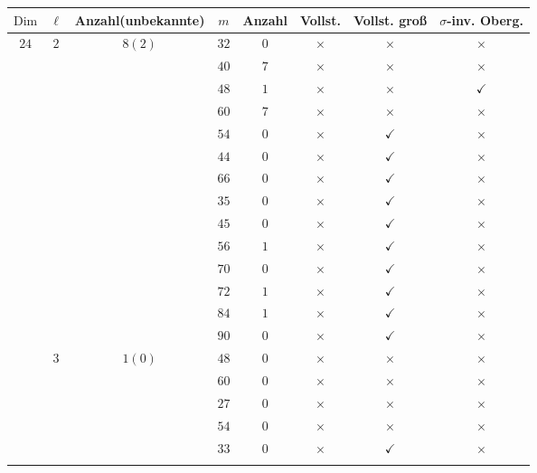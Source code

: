\documentclass[12pt,a4paper,halfparskip,headsepline,bibtotocnumbered]{scrreprt}
\theoremstyle{nummermitklammern}
\theoremstyle{nonumberbreak}
\newcommand{\Dim}{\text{Dim}}
\begin{document}
\begin{table}[H]
	\centering
	\begin{tabular}{|c|c|c|c|c|c|c|c|}
		\hline		
		$\Dim$					&$\ell$					&{Anzahl(unbekannte)}		&$m$	&Anzahl	&Vollst.	&Vollst. groß	&$\sigma$-inv. Oberg.\\ \hline
		\multirow{24}{*}{$24$}	&\multirow{14}{*}{$2$}	&\multirow{14}{*}{$8(2)$}	&$32$	&$0$	&$\times$		&$\times$		&$\times$\\ \cline{4-8}
								&						&							&$40$	&$7$	&$\times$		&$\times$		&$\times$\\ \cline{4-8}
								&						&							&$48$	&$1$	&$\times$		&$\times$		&$\checkmark$\\ \cline{4-8}
								&						&							&$60$	&$7$	&$\times$		&$\times$		&$\times$\\ \cline{4-8}
								&						&							&$54$	&$0$	&$\times$		&$\checkmark$	&$\times$\\ \cline{4-8}
								&						&							&$44$	&$0$	&$\times$		&$\checkmark$	&$\times$\\ \cline{4-8}
								&						&							&$66$	&$0$	&$\times$		&$\checkmark$	&$\times$\\ \cline{4-8}
								&						&							&$35$	&$0$	&$\times$		&$\checkmark$	&$\times$\\ \cline{4-8}
								&						&							&$45$	&$0$	&$\times$		&$\checkmark$	&$\times$\\ \cline{4-8}
								&						&							&$56$	&$1$	&$\times$		&$\checkmark$	&$\times$\\ \cline{4-8}
								&						&							&$70$	&$0$	&$\times$		&$\checkmark$	&$\times$\\ \cline{4-8}
								&						&							&$72$	&$1$	&$\times$		&$\checkmark$	&$\times$\\ \cline{4-8}
								&						&							&$84$	&$1$	&$\times$		&$\checkmark$	&$\times$\\ \cline{4-8}
								&						&							&$90$	&$0$	&$\times$		&$\checkmark$	&$\times$\\ \cline{2-8}
								&\multirow{10}{*}{$3$}	&\multirow{10}{*}{$1(0)$}	&$48$	&$0$	&$\times$		&$\times$		&$\times$\\ \cline{4-8}
								&						&							&$60$	&$0$	&$\times$		&$\times$		&$\times$\\ \cline{4-8}
								&						&							&$27$	&$0$	&$\times$		&$\times$		&$\times$\\ \cline{4-8}
								&						&							&$54$	&$0$	&$\times$		&$\times$		&$\times$\\ \cline{4-8}
								&						&							&$33$	&$0$	&$\times$		&$\checkmark$	&$\times$\\ \cline{4-8}

\end{tabular}
\end{table}
\end{document}

